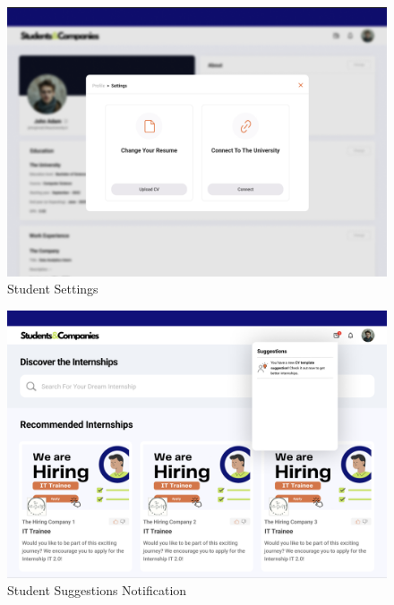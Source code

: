 \documentclass{article}
\begin{document}
\begin{figure}[H]
    \centering
    \includegraphics[scale = 0.42]{figures/UserInterfaces/Student/Settings.png}
    \caption{Student Settings}
     \centering
\end{figure}
\begin{figure}[H]
    \centering
    \includegraphics[scale = 0.42]{figures/UserInterfaces/Student/SuggestionNotification.png}
    \caption{Student Suggestions Notification}
     \centering
\end{figure}
\end{document}

